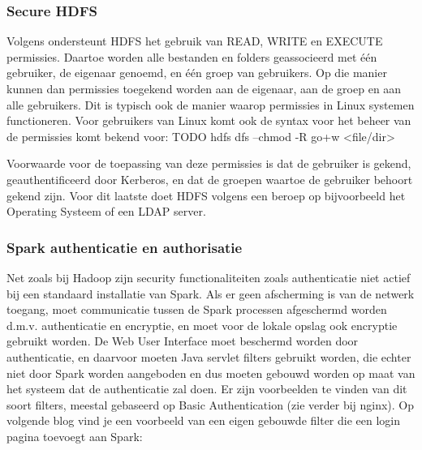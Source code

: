 \subsubsection{Secure HDFS}
Volgens \textcite{Hadoop2023b} ondersteunt HDFS het gebruik van READ, WRITE en EXECUTE permissies. Daartoe worden alle bestanden en folders geassocieerd met één gebruiker, de eigenaar genoemd, en één groep van gebruikers.
Op die manier kunnen dan permissies toegekend worden aan de eigenaar, aan de groep en aan alle gebruikers. Dit is typisch ook de manier waarop permissies in Linux systemen functioneren.
\newline
Voor gebruikers van Linux komt ook de syntax voor het beheer van de permissies komt bekend voor:
TODO
hdfs dfs –chmod -R go+w <file/dir>


Voorwaarde voor de toepassing van deze permissies is dat de gebruiker is gekend, geauthentificeerd door Kerberos, en dat de groepen waartoe de gebruiker behoort gekend zijn. Voor dit laatste doet HDFS volgens \textcite{Hadoop2023c} een beroep op bijvoorbeeld het Operating Systeem of een LDAP server.


\subsubsection {Spark authenticatie en authorisatie} \autocite{Spark2023c}
Net zoals bij Hadoop zijn security functionaliteiten zoals authenticatie niet actief bij een standaard installatie van Spark. Als er geen afscherming is van de netwerk toegang, moet communicatie tussen de Spark processen afgeschermd worden d.m.v. authenticatie en encryptie, en moet voor de lokale opslag ook encryptie gebruikt worden. De Web User Interface moet beschermd worden door authenticatie, en daarvoor moeten Java servlet filters gebruikt worden, die echter niet door Spark worden aangeboden en dus moeten gebouwd worden op maat van het systeem dat de authenticatie zal doen.
Er zijn voorbeelden te vinden van dit soort filters, meestal gebaseerd op Basic Authentication (zie verder bij nginx). Op volgende blog vind je een voorbeeld van een eigen gebouwde filter die een login pagina toevoegt aan Spark: \textcite{Cacoveanu2019}
\newline
\newline


